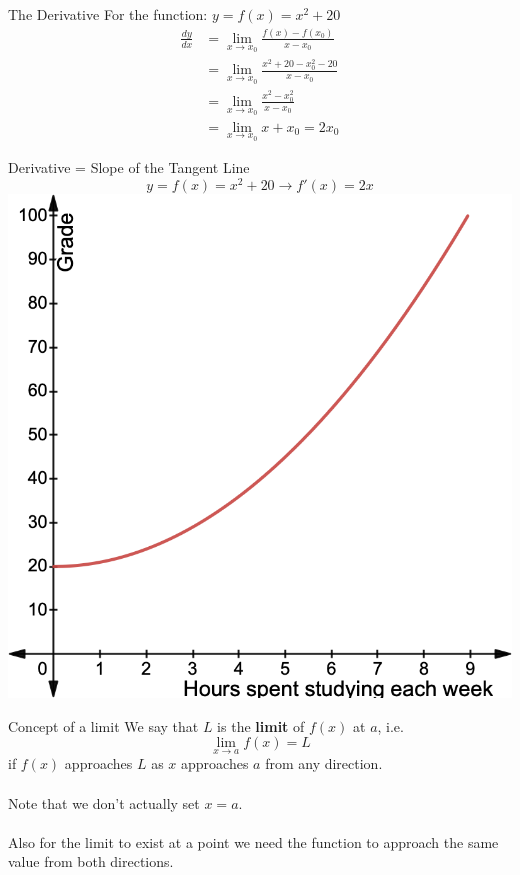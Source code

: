 \documentclass{./../../Latex/teaching_slides}
\begin{document}
\begin{frame}{The Derivative}
For the function: $y=f(x)=x^{2}+20$
\begin{align*} \frac{d y}{d x}&= \lim_{ x \rightarrow x_0} \frac{f(x)-f(x_{0})}{x-x_0} \\
& = \lim_{ x \rightarrow x_0} \frac{x^2+20-x_0^2-20}{x-x_0} \\
& = \lim_{ x \rightarrow x_0} \frac{x^2-x_0^2}{x-x_0} \\
& = \lim_{ x \rightarrow x_0} x+x_0 = 2x_0
\end{align*}
\end{frame}

\begin{frame}{Derivative = Slope of the Tangent Line}
\vspace{-1.5em}
$$y=f(x)=x^{2}+20 \rightarrow f'(x) = 2x$$ 
\centering
\includegraphics[scale=0.225]{function.png}
\end{frame}

\begin{frame}{Concept of a limit}
We say that $L$ is the \textbf{limit} of $f(x)$ at $a$, i.e. $$\lim_{x \rightarrow a} f(x) = L$$
if $f(x)$ approaches $L$ as $x$ approaches $a$ from any direction. \\~\\

Note that we don't actually set $x=a$. \\~\\

Also for the limit to exist at a point we need the function to approach the same value from both directions. 
\end{frame}
\end{document}
